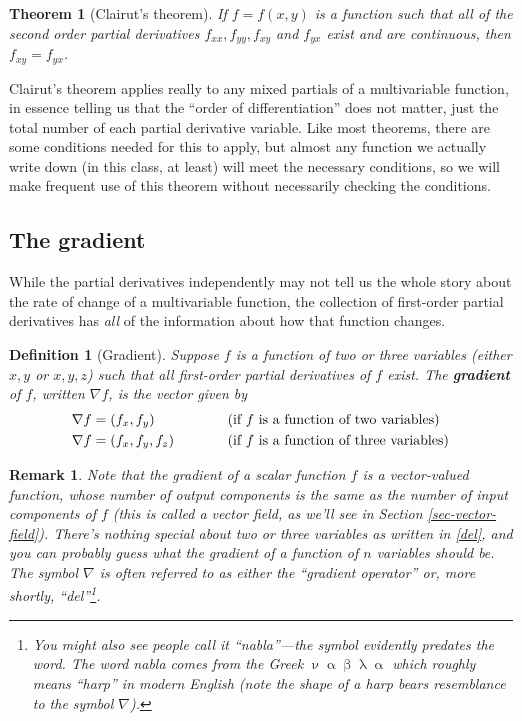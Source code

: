 \documentclass[12pt]{article}
\numberwithin{equation}{subsection}
\numberwithin{figure}{subsection}
\newtheorem{thm}[subsection]{Theorem}
\newtheorem{defn}[subsection]{Definition}
\theoremstyle{note}
\newtheorem{remark}[subsection]{Remark}
\begin{document}
{\begin{thm}[Clairut's theorem]  \label{Clairut-thm} If $f=f(x,y)$ is a function such that all of the second order partial derivatives $f_{xx}, f_{yy}, f_{xy}$ and $f_{yx}$ exist and are continuous, then $f_{xy}=f_{yx}$.
\end{thm}

Clairut's theorem applies really to any mixed partials of a multivariable function, in essence telling us that the ``order of differentiation'' does not matter, just the total number of each partial derivative variable. Like most theorems, there are some conditions needed for this to apply, but almost any function we actually write down (in this class, at least) will meet the necessary conditions, so we will make frequent use of this theorem without necessarily checking the conditions.


\subsection{The gradient}

While the partial derivatives independently may not tell us the whole story about the rate of change of a multivariable function, the collection of first-order partial derivatives has \textit{all} of the information about how that function changes. 

\begin{defn}[Gradient] Suppose $f$ is a function of two or three variables (either $x,y$ or $x,y,z$) such that all first-order partial derivatives of $f$ exist. The \textbf{gradient} of $f$, written $\nabla f$, is the \textit{vector} given by \begin{align}  \label{del}
	&\nabla f =(f_x,f_y) & \hspace{10mm} & (\text{if $f$ is a function of two variables})  \nonumber \\
	&\nabla f =(f_x,f_y,f_z) & & (\text{if $f$ is a function of three variables}) 
\end{align}
\end{defn}

\begin{remark}Note that the gradient of a scalar function $f$ is a vector-valued function, whose number of output components is the same as the number of input components of $f$ (this is called a vector field, as we'll see in Section \ref{sec-vector-field}). There's nothing special about two or three variables as written in \eqref{del}, and you can probably guess what the gradient of a function of $n$ variables should be. The symbol $\nabla$ is often referred to as either the ``gradient operator'' or, more shortly, ``del''\footnote{You might also see people call it ``nabla''---the symbol evidently predates the word. The word \textit{nabla} comes from the Greek $\upnu \upalpha \upbeta \uplambda \upalpha$ which roughly means ``harp'' in modern English (note the shape of a harp bears resemblance to the symbol $\nabla$).}.\end{remark}

}
\end{document}
